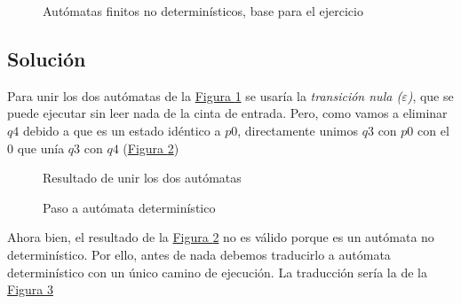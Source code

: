 \documentclass[10pt,a4paper,spanish]{report}
\begin{document}
\begin{figure}[!h]
\centering

\caption{Autómatas finitos no determinísticos, base para el ejercicio}
\label{automatas}
\end{figure}

\section{\textcolor{p3}Solución}

Para unir los dos autómatas de la \hyperref[automatas]{Figura \ref*{automatas}} se usaría la \textit{\textcolor{p3}{transición nula ($\varepsilon$)}}, que se puede ejecutar sin leer nada de la cinta de entrada. Pero, como vamos a eliminar $q4$ debido a que es un estado idéntico a $p0$, directamente unimos $q3$ con $p0$ con el $0$ que unía $q3$ con $q4$ (\hyperref[automatas1]{Figura \ref*{automatas1}})

\begin{figure}[!h]
\centering

\caption{Resultado de unir los dos autómatas}
\label{automatas1}
\end{figure}


\begin{figure}[!h]
\centering

\caption{Paso a autómata determinístico}
\label{solucion3}
\end{figure}

Ahora bien, el resultado de la \hyperref[automatas1]{Figura \ref*{automatas1}} no es válido porque es un autómata no determinístico. Por ello, antes de nada debemos traducirlo a autómata determinístico con un único camino de ejecución. La traducción sería la de la \hyperref[solucion3]{Figura \ref*{solucion3}}


\chapter*{}
\thispagestyle{empty}

\\[1cm]
\end{document}
